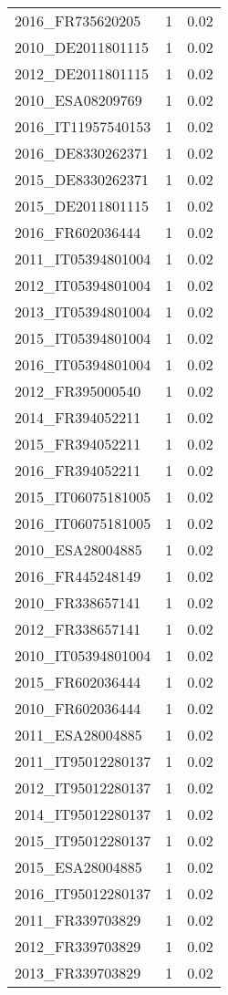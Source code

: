 \begin{table*}[htbp]
\begin{tabular}{lrr}
2016_FR735620205 & 1 & 0.02 \\
2010_DE2011801115 & 1 & 0.02 \\
2012_DE2011801115 & 1 & 0.02 \\
2010_ESA08209769 & 1 & 0.02 \\
2016_IT11957540153 & 1 & 0.02 \\
2016_DE8330262371 & 1 & 0.02 \\
2015_DE8330262371 & 1 & 0.02 \\
2015_DE2011801115 & 1 & 0.02 \\
2016_FR602036444 & 1 & 0.02 \\
2011_IT05394801004 & 1 & 0.02 \\
2012_IT05394801004 & 1 & 0.02 \\
2013_IT05394801004 & 1 & 0.02 \\
2015_IT05394801004 & 1 & 0.02 \\
2016_IT05394801004 & 1 & 0.02 \\
2012_FR395000540 & 1 & 0.02 \\
2014_FR394052211 & 1 & 0.02 \\
2015_FR394052211 & 1 & 0.02 \\
2016_FR394052211 & 1 & 0.02 \\
2015_IT06075181005 & 1 & 0.02 \\
2016_IT06075181005 & 1 & 0.02 \\
2010_ESA28004885 & 1 & 0.02 \\
2016_FR445248149 & 1 & 0.02 \\
2010_FR338657141 & 1 & 0.02 \\
2012_FR338657141 & 1 & 0.02 \\
2010_IT05394801004 & 1 & 0.02 \\
2015_FR602036444 & 1 & 0.02 \\
2010_FR602036444 & 1 & 0.02 \\
2011_ESA28004885 & 1 & 0.02 \\
2011_IT95012280137 & 1 & 0.02 \\
2012_IT95012280137 & 1 & 0.02 \\
2014_IT95012280137 & 1 & 0.02 \\
2015_IT95012280137 & 1 & 0.02 \\
2015_ESA28004885 & 1 & 0.02 \\
2016_IT95012280137 & 1 & 0.02 \\
2011_FR339703829 & 1 & 0.02 \\
2012_FR339703829 & 1 & 0.02 \\
2013_FR339703829 & 1 & 0.02 \\

\end{tabular}
\end{table*}
